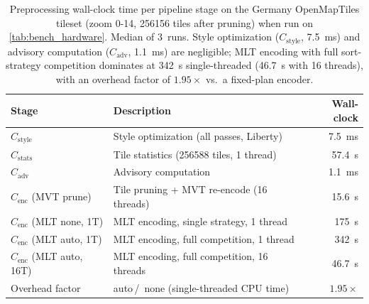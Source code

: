 \begin{table}[htbp]
\centering\small
\begin{tabular}{l l r}
\textbf{Stage} & \textbf{Description} & \textbf{Wall-clock} \\
\midrule
$C_\text{style}$ & Style optimization (all passes, Liberty) & \qty{7.5}{\milli\second} \\
$C_\text{stats}$ & Tile statistics (\num{256588} tiles, 1 thread) & \qty{57.4}{\second} \\
$C_\text{adv}$ & Advisory computation & \qty{1.1}{\milli\second} \\
$C_\text{enc}$ (\ac{MVT} prune) & Tile pruning + \ac{MVT} re-encode (16 threads) & \qty{15.6}{\second} \\
$C_\text{enc}$ (\ac{MLT} none, 1T) & \ac{MLT} encoding, single strategy, 1 thread & \qty{175}{\second} \\
$C_\text{enc}$ (\ac{MLT} auto, 1T) & \ac{MLT} encoding, full competition, 1 thread & \qty{342}{\second} \\
$C_\text{enc}$ (\ac{MLT} auto, 16T) & \ac{MLT} encoding, full competition, 16 threads & \qty{46.7}{\second} \\
\midrule
Overhead factor & auto\,/ \,none (single-threaded CPU time) & $1.95\times$ \\
\end{tabular}
\caption{
Preprocessing wall-clock time per pipeline stage on the Germany OpenMapTiles tileset (zoom 0-14, \num{256156} tiles after pruning) when run on \cref{tab:bench_hardware}.
Median of 3~runs.
Style optimization ($C_\text{style}$, \qty{7.5}{\milli\second}) and advisory computation ($C_\text{adv}$, \qty{1.1}{\milli\second}) are negligible; \ac{MLT} encoding with full sort-strategy competition dominates at \qty{342}{\second} single-threaded (\qty{46.7}{\second} with 16 threads), with an overhead factor of $1.95\times$ vs.\ a fixed-plan encoder.}
\label{tab:preprocessing_cost}
\end{table}

